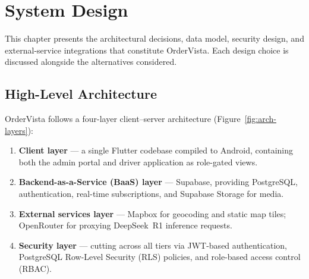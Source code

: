 \chapter{System Design}
\label{ch:design}

This chapter presents the architectural decisions, data model, security design,
and external-service integrations that constitute OrderVista.  Each design
choice is discussed alongside the alternatives considered.

\section{High-Level Architecture}
\label{sec:architecture}

OrderVista follows a four-layer client--server architecture
(Figure~\ref{fig:arch-layers}):

\begin{enumerate}
  \item \textbf{Client layer} — a single Flutter codebase compiled to Android,
        containing both the admin portal and driver application as role-gated
        views.
  \item \textbf{Backend-as-a-Service (BaaS) layer} — Supabase, providing
        PostgreSQL, authentication, real-time subscriptions, and Supabase
        Storage for media.
  \item \textbf{External services layer} — Mapbox for geocoding and static map
        tiles; OpenRouter for proxying DeepSeek~R1 inference requests.
  \item \textbf{Security layer} — cutting across all tiers via JWT-based
        authentication, PostgreSQL Row-Level Security (RLS) policies, and
        role-based access control (RBAC).
\end{enumerate}

